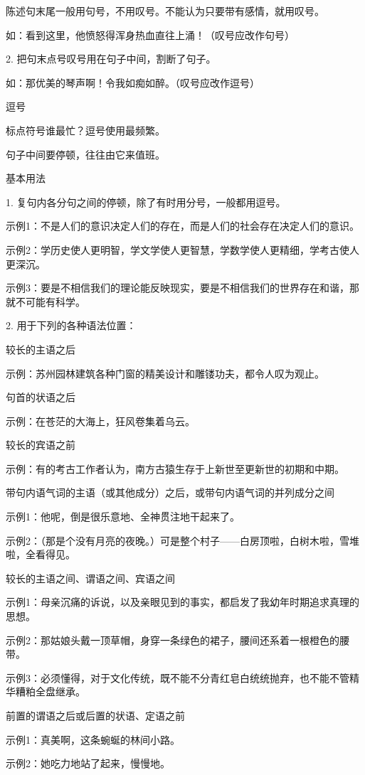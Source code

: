 陈述句末尾一般用句号，不用叹号。不能认为只要带有感情，就用叹号。

如：看到这里，他愤怒得浑身热血直往上涌！（叹号应改作句号）

2. 把句末点号叹号用在句子中间，割断了句子。

如：那优美的琴声啊！令我如痴如醉。（叹号应改作逗号）

逗号

标点符号谁最忙？逗号使用最频繁。

句子中间要停顿，往往由它来值班。

基本用法

1. 复句内各分句之间的停顿，除了有时用分号，一般都用逗号。

示例1：不是人们的意识决定人们的存在，而是人们的社会存在决定人们的意识。

示例2：学历史使人更明智，学文学使人更智慧，学数学使人更精细，学考古使人更深沉。

示例3：要是不相信我们的理论能反映现实，要是不相信我们的世界存在和谐，那就不可能有科学。

2. 用于下列的各种语法位置：

较长的主语之后

示例：苏州园林建筑各种门窗的精美设计和雕镂功夫，都令人叹为观止。

句首的状语之后

示例：在苍茫的大海上，狂风卷集着乌云。

较长的宾语之前

示例：有的考古工作者认为，南方古猿生存于上新世至更新世的初期和中期。

带句内语气词的主语（或其他成分）之后，或带句内语气词的并列成分之间

示例1：他呢，倒是很乐意地、全神贯注地干起来了。

示例2：（那是个没有月亮的夜晚。）可是整个村子——白房顶啦，白树木啦，雪堆啦，全看得见。

较长的主语之间、谓语之间、宾语之间

示例1：母亲沉痛的诉说，以及亲眼见到的事实，都启发了我幼年时期追求真理的思想。

示例2：那姑娘头戴一顶草帽，身穿一条绿色的裙子，腰间还系着一根橙色的腰带。

示例3：必须懂得，对于文化传统，既不能不分青红皂白统统抛弃，也不能不管精华糟粕全盘继承。

前置的谓语之后或后置的状语、定语之前

示例1：真美啊，这条蜿蜒的林间小路。

示例2：她吃力地站了起来，慢慢地。

